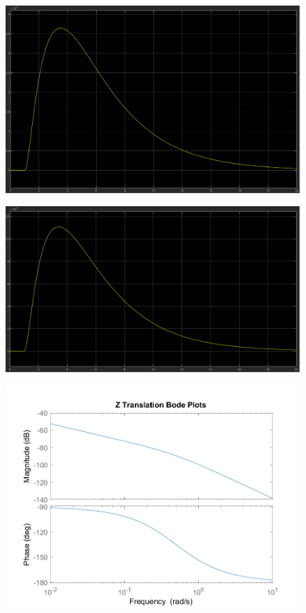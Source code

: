 \documentclass[12pt]{article}
\begin{document}
\begin{figure}[h]
\includegraphics[width=0.9\linewidth]{images/Roll_response.png}
\centering
\end{figure}

\begin{figure}[h]
\includegraphics[width=0.9\linewidth]{images/Yaw_response.png}
\centering
\end{figure}

\begin{figure}[h]
\includegraphics[width=0.75\linewidth]{images/Z_bode.png}
\centering
\end{figure}
\end{document}
